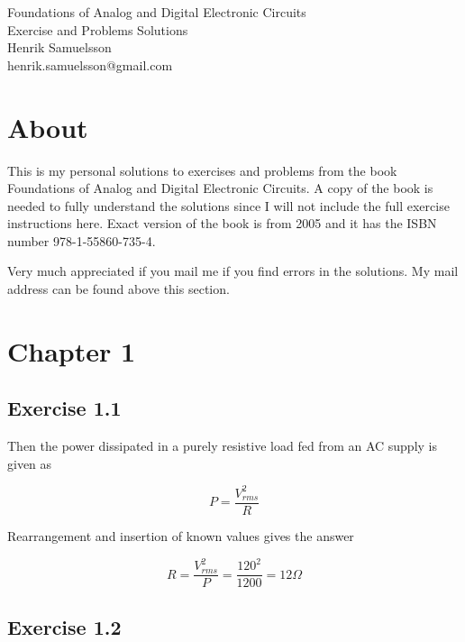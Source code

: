 \documentclass[]{article}
\begin{document}
\begingroup  
	\raggedright
	\Large Foundations of Analog and Digital Electronic Circuits\\
	\Large Exercise and Problems Solutions\\
	\vspace{3mm} %
	\normalsize Henrik Samuelsson\\
	\normalsize henrik.samuelsson@gmail.com
\endgroup
	
\section*{About}
	This is my personal solutions to exercises and problems from the book Foundations of Analog and Digital Electronic Circuits. A copy of the book is needed to fully understand the solutions since I will not include the full exercise instructions here. Exact version of the book is from 2005 and it has the ISBN number 978-1-55860-735-4. 
	
	Very much appreciated if you mail me if you find errors in the solutions. My mail address can be found above this section.

\section*{Chapter 1}

\subsection*{Exercise 1.1}
	
	Then the power dissipated in a purely resistive load fed from an AC supply is given as
	
	\begin{equation*}
		P = \dfrac{ V^{2}_{rms} }{ R }
	\end{equation*}
		
	Rearrangement and insertion of known values gives the answer
	
	\begin{equation*}
		R = \dfrac{ V^{2}_{rms} }{ P } = \dfrac{ 120^{2} }{ 1200 } = 12 \Omega
	\end{equation*}	

\subsection*{Exercise 1.2}
\end{document}
